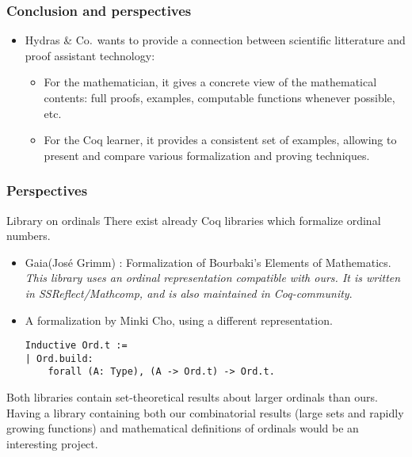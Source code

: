 \documentclass[10pt]{beamer}
\newcommand{\TODO}[2][]{[\textcolor{red}{TODO (#1):} \emph{#2}]}
\newcommand{\coq}{Coq\xspace}
\newcommand{\community}{Coq-community\xspace}
\newcommand{\gaia}{Gaia\xspace}
\newcommand{\Hydras}{Hydras \& Co$\text.$\xspace}
\begin{document}


\begin{frame}
  \frametitle{Conclusion and perspectives}
  \begin{block}{}
    \begin{itemize}
    \item \Hydras wants to provide  a connection between scientific litterature and proof assistant technology:
      \begin{itemize}
      \item For the mathematician, it gives a concrete view of the mathematical contents: full proofs, examples, computable functions whenever possible, etc.
        \item  For the \coq learner, it provides a consistent set of examples,
allowing to present and compare various formalization and proving techniques.
      \end{itemize}
    \end{itemize}
  \end{block}
  \end{frame}


\begin{frame}[fragile]
  \frametitle{Perspectives}
  \begin{block}{Library on ordinals}
    There exist already \coq libraries which formalize ordinal numbers.
    \begin{itemize}
    \item \gaia (José Grimm) : Formalization of Bourbaki's Elements of Mathematics. {\color{lookcolor}\emph{This library uses an ordinal representation compatible with ours. It is  written in SSReflect/Mathcomp, and is also maintained in \community}.}
    \item A formalization by Minki Cho, using a different representation.
{\color{darkorange}
\begin{verbatim}
Inductive Ord.t :=
| Ord.build: 
    forall (A: Type), (A -> Ord.t) -> Ord.t.
\end{verbatim}
}  
    \end{itemize}

    Both libraries contain set-theoretical results about larger ordinals than ours. Having a library containing both our combinatorial results (large sets and rapidly growing functions) and mathematical definitions of ordinals would be an interesting project.
  \end{block}
\end{frame}
\end{document}
